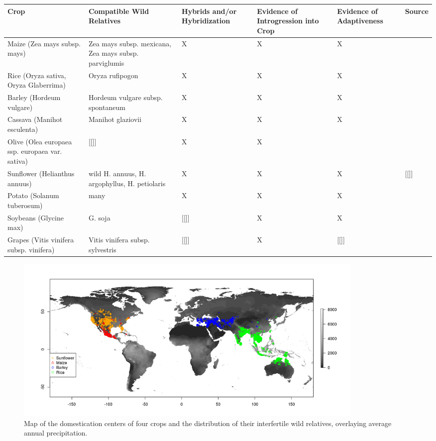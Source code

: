 \documentclass[11pt]{article}
\begin{document}
\begin{table}
\centering
\begin{adjustbox}{width=1\textwidth}
\small
\label{my-label}
\begin{tabular}{llllll}
\hline
Crop & Compatible Wild Relatives & Hybrids and/or Hybridization & Evidence of Introgression into Crop & Evidence of Adaptiveness & Source \\
\hline
Maize (Zea mays subsp. mays) & Zea mays subsp. mexicana, Zea mays subsp. parviglumis & X & X & X & \cite{hufford2013genomic} \\
Rice (Oryza sativa, Oryza Glaberrima) & Oryza rufipogon & X & X & X & \cite{Huang2012} \\
Barley (Hordeum vulgare) & Hordeum vulgare subsp. spontaneum & X & X & X & \cite{Poets2015} \\
Cassava (Manihot esculenta) & Manihot glaziovii & X & X & X & \cite{bredeson2016sequencing} \\
Olive (Olea europaea ssp. europaea var. sativa) & [[]] & X & X & & \cite{diez2015olive} \\
Sunflower (Helianthus annuus) & wild H. annuus, H. argophyllus, H. petiolaris & X & X & X & [[]]\\
Potato (Solanum tuberosum) & many & X & X & X & \cite{johns1986ongoing} \\
Soybeans (Glycine max) & G. soja & [[]] & X & X & \cite{lam2010resequencing} \\
Grapes (Vitis vinifera subsp. vinifera) & Vitis vinifera subsp. sylvestris & [[]] & X & [[]] &  \cite{myles2011genetic} \\
\hline
\end{tabular}
\end{adjustbox}
\end{table}

\begin{figure}[h]
	\centering
	\includegraphics[width=17.35cm]{map.png}
	\caption{Map of the domestication centers of four crops and the distribution of their interfertile wild relatives, overlaying average annual precipitation.}
	\label{boxplot:map}
\end{figure}
\end{document}
